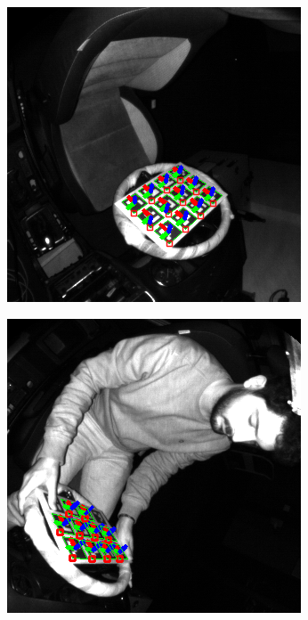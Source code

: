\begin{figure}[ht]
    \centering
    \begin{subfigure}[t]{0.23\textwidth}
        \centering
        \includegraphics[width=\textwidth]{media/chapter 5/aruco_board_estimation0.png}
    \end{subfigure}\hfill
    \begin{subfigure}[t]{0.23\textwidth}
        \centering
        \includegraphics[width=\textwidth]{media/chapter 5/aruco_board_estimation1.png}

\end{subfigure}
\end{figure}
